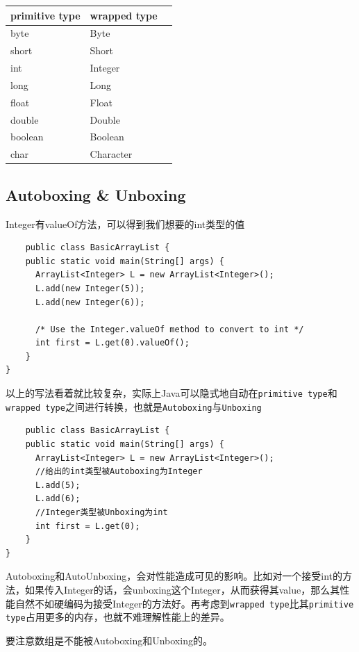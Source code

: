 \documentclass[12pt, a4paper, openany]{ctexbook} %
\begin{document}
\begin{table}[h]
\centering
\begin{tabular}{@{}lll@{}}
\toprule
\textbf{primitive type} & \textbf{wrapped type}
\\ \midrule
byte & Byte \\
short & Short \\
int & Integer \\
long & Long\\
float & Float \\
double & Double \\
boolean & Boolean\\
char & Character \\
\bottomrule
\end{tabular}
\end{table}
\par

\subsection{Autoboxing & Unboxing}
Integer有valueOf方法，可以得到我们想要的int类型的值

\begin{lstlisting}
    public class BasicArrayList {
    public static void main(String[] args) {
      ArrayList<Integer> L = new ArrayList<Integer>();
      L.add(new Integer(5));
      L.add(new Integer(6));

      /* Use the Integer.valueOf method to convert to int */
      int first = L.get(0).valueOf();
    }
}

\end{lstlisting}
\par
以上的写法看着就比较复杂，实际上Java可以隐式地自动在\texttt{primitive type}和\texttt{wrapped type}之间进行转换，也就是\texttt{Autoboxing}与\texttt{Unboxing}
\begin{lstlisting}
    public class BasicArrayList {
    public static void main(String[] args) {
      ArrayList<Integer> L = new ArrayList<Integer>();
      //给出的int类型被Autoboxing为Integer
      L.add(5);
      L.add(6);
      //Integer类型被Unboxing为int
      int first = L.get(0);
    }
}
\end{lstlisting}
\par
Autoboxing和AutoUnboxing，会对性能造成可见的影响。比如对一个接受int的方法，如果传入Integer的话，会unboxing这个Integer，从而获得其value，那么其性能自然不如硬编码为接受Integer的方法好。再考虑到\texttt{wrapped type}比其\texttt{primitive type}占用更多的内存，也就不难理解性能上的差异。
\par
要注意数组是不能被Autoboxing和Unboxing的。
\end{document}
